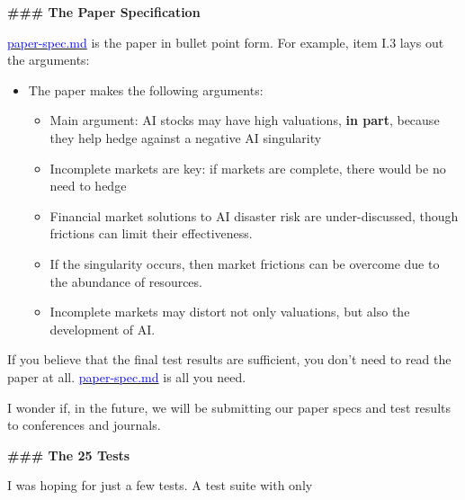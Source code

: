 \documentclass[12pt]{article}
\begin{document}
\begin{mdframed}[
linewidth=1pt,
linecolor=black,
innerleftmargin=0.25em,
innerrightmargin=0.25em,
innertopmargin=0.2\baselineskip,
innerbottommargin=0.8\baselineskip
]
\par
{\large\bfseries \textcolor{red!70!black}{\#\#\# The Paper Specification}}
\par

\href{https://github.com/chenandrewy/ralph-wiggum-asset-pricing/blob/main/spec/paper-spec.md}{\textcolor{blue}{paper-spec.md}} is the paper in bullet point form. For example, item I.3 lays out the arguments:

\vspace{-2ex}
\begin{itemize}
\setlength{\itemsep}{0.15em}
\setlength{\parskip}{0pt}
\item[3.] The paper makes the following arguments:
\begin{itemize}
\setlength{\itemsep}{0.15em}
\setlength{\parskip}{0pt}
\item[a.] Main argument: AI stocks may have high valuations, \textbf{in part}, because they help hedge against a negative AI singularity
\item[b.] Incomplete markets are key: if markets are complete, there would be no need to hedge
\item[c.] Financial market solutions to AI disaster risk are under-discussed, though frictions can limit their effectiveness.
\item[d.] If the singularity occurs, then market frictions can be overcome due to the abundance of resources.
\item[e.] Incomplete markets may distort not only valuations, but also the development of AI.
\end{itemize}
\end{itemize}
\vspace{-2ex}

If you believe that the final test results are sufficient, you don't need to read the paper at all. \href{https://github.com/chenandrewy/ralph-wiggum-asset-pricing/blob/main/spec/paper-spec.md}{\textcolor{blue}{paper-spec.md}} is all you need.

I wonder if, in the future, we will be submitting our paper specs and test results to conferences and journals.

\par
{\large\bfseries \textcolor{red!70!black}{\#\#\# The 25 Tests}}
\par

I was hoping for just a few tests.  A test suite with only


\end{mdframed}
\end{document}
